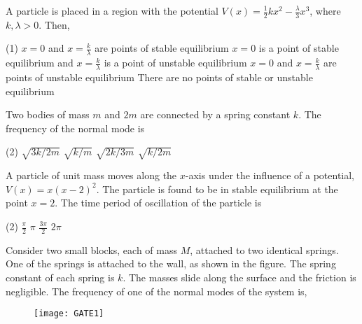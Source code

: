 \begin{enumerate}
\begin{minipage}{\textwidth}
	\item A particle is placed in a region with the potential $V(x)=\frac{1}{2} k x^{2}-\frac{\lambda}{3} x^{3}$, where $k, \lambda>0$.
	Then,
\end{minipage}
\begin{tasks}(1)
	\task[\textbf{A.}] $x=0$ and $x=\frac{k}{\lambda}$ are points of stable equilibrium
	\task[\textbf{B.}]$x=0$ is a point of stable equilibrium and $x=\frac{k}{\lambda}$ is a point of unstable equilibrium
	\task[\textbf{C.}]$x=0$ and $x=\frac{k}{\lambda}$ are points of unstable equilibrium
	\task[\textbf{D.}]There are no points of stable or unstable equilibrium
\end{tasks}
\begin{minipage}{\textwidth}
	\item Two bodies of mass $m$ and $2 m$ are connected by a spring constant $k$. The frequency of the normal mode is
\end{minipage}
\begin{tasks}(2)
	\task[\textbf{A.}] $\sqrt{3 k / 2 m}$
	\task[\textbf{B.}]$\sqrt{k / m}$
	\task[\textbf{C.}] $\sqrt{2 k / 3 m}$
	\task[\textbf{D.}]$\sqrt{k / 2 m}$
\end{tasks}
\begin{minipage}{\textwidth}
	\item A particle of unit mass moves along the $x$-axis under the influence of a potential, $V(x)=x(x-2)^{2}$. The particle is found to be in stable equilibrium at the point $x=2$. The time period of oscillation of the particle is
\end{minipage}
\begin{tasks}(2)
	\task[\textbf{A.}] $\frac{\pi}{2}$
	\task[\textbf{B.}]$\pi$
	\task[\textbf{C.}]$\frac{3 \pi}{2}$
	\task[\textbf{D.}]$2 \pi$
\end{tasks}
\begin{minipage}{\textwidth}
	\item Consider two small blocks, each of mass $M$, attached to two identical springs. One of the springs is attached to the wall, as shown in the figure. The spring constant of each spring is $k$. The masses slide along the surface and the friction is negligible. The frequency of one of the normal modes of the system is,
	\begin{figure}[H]
		\centering
		\texttt{[image: GATE1]}

\end{figure}
\end{minipage}
\end{enumerate}
